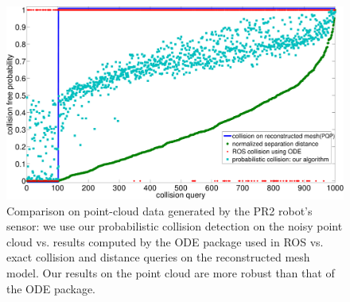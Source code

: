 \begin{figure}[!htb]
\centering
\includegraphics[width=0.79\linewidth]{figs/7/pr2res.pdf}
\caption[Comparison of collision checking algorithms with and without considering data uncertainty on point-cloud data generated by PR2 robot sensor]{\label{fig:7:res2} Comparison on point-cloud data generated by the PR2 robot's sensor: we use our probabilistic collision detection on the noisy point
cloud vs. results computed by the ODE package used in ROS vs. exact collision and distance queries on the reconstructed mesh model. Our results on the point cloud
are more robust than that of the ODE package.}
\end{figure}


